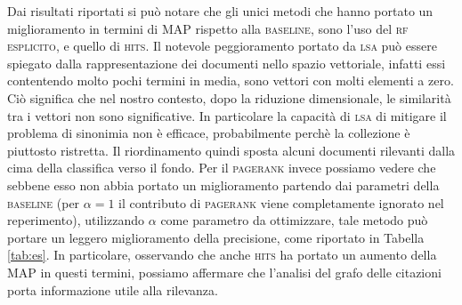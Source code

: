 Dai risultati riportati si pu\`o notare che gli unici metodi che hanno portato un miglioramento in termini di MAP rispetto alla \textsc{baseline}, sono l'uso del \textsc{rf esplicito}, e quello di \textsc{hits}. Il notevole peggioramento portato da \textsc{lsa} pu\`o essere spiegato dalla rappresentazione dei documenti nello spazio vettoriale, infatti essi contentendo molto pochi termini in media, sono vettori con molti elementi a zero. Ci\`o significa che nel nostro contesto, dopo la riduzione dimensionale, le similarit\`a tra i vettori non sono significative. In particolare la capacit\`a di \textsc{lsa} di mitigare il problema di sinonimia non \`e efficace, probabilmente perch\`e la collezione \`e piuttosto ristretta. Il riordinamento quindi sposta alcuni documenti rilevanti dalla cima della classifica verso il fondo. Per il \textsc{pagerank} invece possiamo vedere che sebbene esso non abbia portato un miglioramento partendo dai parametri della \textsc{baseline} (per $\alpha = 1$ il contributo di \textsc{pagerank} viene completamente ignorato nel reperimento), utilizzando $\alpha$ come parametro da ottimizzare, tale metodo pu\`o portare un leggero miglioramento della precisione, come riportato in Tabella \ref{tab:es}. In particolare, osservando che anche \textsc{hits} ha portato un aumento della MAP in questi termini, possiamo affermare che l'analisi del grafo delle citazioni porta informazione utile alla rilevanza.

